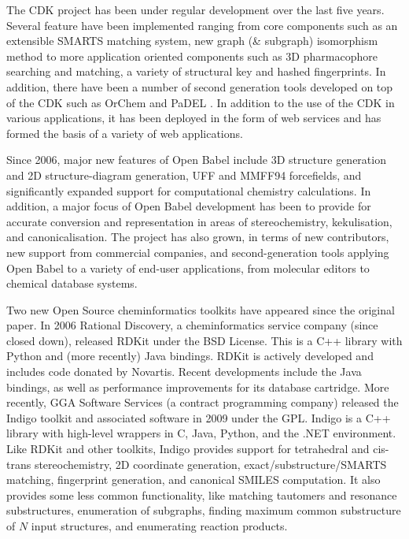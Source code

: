 \documentclass[10pt]{bmc_article}
\newenvironment{bmcformat}{\fussy\setboolean{publ}{true}}{\fussy}
\begin{document}
\begin{bmcformat}
The CDK project has been under regular development over the last five
years. Several feature have been implemented ranging from core
components such as an extensible SMARTS matching system, new graph (\&
subgraph) isomorphism method \cite{smsd} to more application oriented
components such as 3D pharmacophore searching and matching, a variety
of structural key and hashed fingerprints. In addition, there have
been a number of second generation tools developed on top of the CDK
such as OrChem \cite{orchem} and PaDEL \cite{padel}. In addition to
the use of the CDK in various applications, it has been deployed in
the form of web services \cite{Dong:2007aa} and has formed the basis
of a variety of web applications.

Since 2006, major new features of Open Babel include 3D structure
generation and 2D structure-diagram generation, UFF and MMFF94
forcefields, and significantly expanded support for computational
chemistry calculations. In addition, a major focus of Open Babel development
has been to provide for accurate conversion and representation in
areas of stereochemistry, kekulisation, and canonicalisation. The
project has also grown, in terms of new contributors, new support from
commercial companies, and second-generation tools applying Open Babel
to a variety of end-user applications, from molecular editors to
chemical database systems.

Two new Open Source cheminformatics toolkits have appeared since the
original paper. In 2006 Rational Discovery, a cheminformatics service
company (since closed down), released RDKit \cite{WebRDKit} under the
BSD License. This is a C++ library with Python and (more recently)
Java bindings. RDKit is actively developed and includes
code donated by Novartis. Recent developments include the Java
bindings, as well as performance improvements for its database
cartridge. More recently, GGA Software Services
(a contract programming company)
released the Indigo toolkit \cite{WebIndigo} and associated software
in 2009 under the GPL. Indigo is a C++ library with
high-level wrappers in C, Java, Python, and the .NET
environment. Like RDKit and other toolkits, Indigo provides support for
tetrahedral and cis-trans stereochemistry, 2D coordinate generation,
exact/substructure/SMARTS matching, fingerprint generation, and
canonical SMILES computation.
It also provides some less common functionality, like matching
tautomers and resonance substructures, enumeration of subgraphs,
finding maximum common substructure of $N$ input structures, and
enumerating reaction products.


\end{bmcformat}
\end{document}
